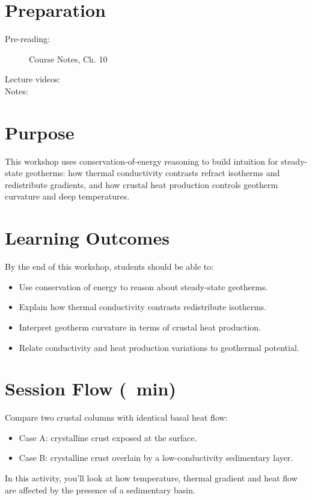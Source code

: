 
\workshopstart

\vspace{-0.75em}
\section*{Preparation}

\begin{description}
  \item[Pre-reading:] Course Notes, Ch. 10
  \item[Lecture videos:]
  \item[Notes:]
\end{description}

\section*{Purpose}

This workshop uses conservation-of-energy reasoning to build intuition for steady-state geotherms: how thermal conductivity contrasts refract isotherms and redistribute gradients, and how crustal heat production controls geotherm curvature and deep temperatures.

\section*{Learning Outcomes}
By the end of this workshop, students should be able to:
\begin{itemize}
  \item Use conservation of energy to reason about steady-state geotherms.
  \item Explain how thermal conductivity contrasts redistribute isotherms.
  \item Interpret geotherm curvature in terms of crustal heat production.
  \item Relate conductivity and heat production variations to geothermal potential.
\end{itemize}

\section*{Session Flow (\timelinelength\ min)}


Compare two crustal columns with identical basal heat flow:
\begin{itemize}
  \item Case A: crystalline crust exposed at the surface.
  \item Case B: crystalline crust overlain by a low-conductivity sedimentary layer.
\end{itemize}
In this activity, you'll look at how temperature, thermal gradient and heat flow are affected by the presence of a sedimentary basin.

